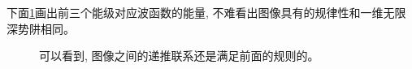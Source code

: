 \documentclass[a4paper,zihao=-4,linespread=1]{ctexrep}
\begin{document}
    下面\ref{fig:2.2}画出前三个能级对应波函数的能量, 不难看出图像具有的规律性和一维无限深势阱相同。
    \begin{figure}[htbp]
        \label{fig:2.2}
        \centering
        \caption{可以看到, 图像之间的递推联系还是满足前面的规则的。}
    \end{figure}
\end{document}
